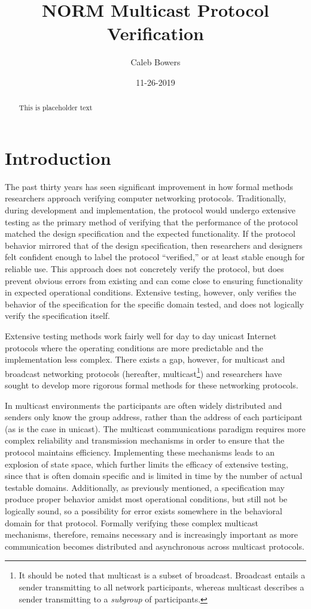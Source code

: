 \documentclass[10pt, journal]{IEEEtran}
\title{NORM Multicast Protocol Verification}
\author{Caleb Bowers}
\date{11-26-2019}
\begin{document}
\maketitle
\begin{abstract}
This is placeholder text
\end{abstract}

\section{Introduction}
The past thirty years has seen significant improvement in how formal methods researchers approach verifying computer networking protocols. Traditionally, during development and implementation, the protocol would undergo extensive testing as the primary method of verifying that the performance of the protocol matched the design specification and the expected functionality. If the protocol behavior mirrored that of the design specification, then researchers and designers felt confident enough to label the protocol ``verified,'' or at least stable enough for reliable use. This approach does not concretely verify the protocol, but does prevent obvious errors from existing and can come close to ensuring functionality in expected operational conditions. Extensive testing, however, only verifies the behavior of the specification for the specific domain tested, and does not logically verify the specification itself.

Extensive testing methods work fairly well for day to day unicast Internet protocols where the operating conditions are more predictable and the implementation less complex. There exists a gap, however, for multicast and broadcast networking protocols (hereafter, multicast\footnote{It should be noted that multicast is a subset of broadcast. Broadcast entails a sender transmitting to all network participants, whereas multicast describes a sender transmitting to a \textit{subgroup} of participants.}) and researchers have sought to develop more rigorous formal methods for these networking protocols. 

In multicast environments the participants are often widely distributed and senders only know the group address, rather than the address of each participant (as is the case in unicast). The multicast communications paradigm requires more complex reliability and transmission mechanisms in order to ensure that the protocol maintains efficiency. Implementing these mechanisms leads to an explosion of state space, which further limits the efficacy of extensive testing, since that is often domain specific and is limited in time by the number of actual testable domains. Additionally, as previously mentioned, a specification may produce proper behavior amidst most operational conditions, but still not be logically sound, so a possibility for error exists somewhere in the behavioral domain for that protocol. Formally verifying these complex multicast mechanisms, therefore, remains necessary and is increasingly important as more communication becomes distributed and asynchronous across multicast protocols.
\end{document}
